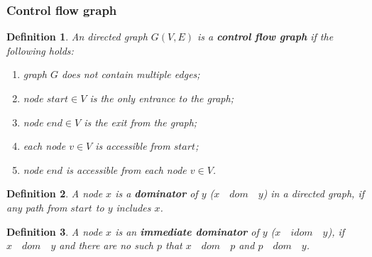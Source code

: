 \documentclass[aspectratio=169]{beamer}
\begin{document}
\begin{frame}
\frametitle{Control flow graph}

\newtheorem{Def}{Definition}[section]
\begin{Def}
An directed graph $G(V,E)$ is a \textbf{control flow graph} if the following holds:
\begin{enumerate}
\item graph $G$ does not contain multiple edges;
\item node $start\in V$ is the only entrance to the graph;
\item node $end \in V$ is the exit from the graph;
\item each node $v \in V$ is accessible from $start$;
\item node $end$ is accessible from each node $v \in V$.
\end{enumerate}
\end{Def}

\newtheorem{DOM}{Definition}[section]
\begin{Def}
A node $x$ is a \textbf{dominator} of $y$ ($x\quad dom\quad y$) in a directed graph, if any path from $start$ to $y$ includes $x$.
\end{Def}

\newtheorem{IDOM}{Definition}[section]
\begin{Def}
A node $x$ is an \textbf{immediate dominator} of $y$ ($x\quad idom\quad y$), if $x\quad dom\quad y$ and there are no such $p$ that $x\quad dom\quad p$ and $p\quad dom\quad y$.
\end{Def}


\end{frame}

\end{document}
